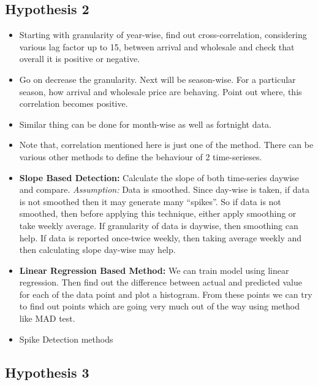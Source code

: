 \subsection{Hypothesis 2}

\begin{itemize}

\item Starting with granularity of year-wise, find out cross-correlation, considering various lag factor up to 15,  between arrival and wholesale and check that overall it is positive or negative.

\item Go on decrease the granularity. Next will be season-wise. For a particular season, how arrival and wholesale price are behaving. Point out where, this correlation becomes positive.

\item Similar thing can be done for month-wise as well as fortnight data. 

\item Note that, correlation mentioned here is just one of the method. There can be various other methods to define the behaviour of 2 time-serieses.

\item \textbf{Slope Based Detection:} Calculate the slope of both time-series daywise and compare. \textit{Assumption:} Data is smoothed. Since day-wise is taken, if data is not smoothed then it may generate many “spikes”. So if data is not smoothed, then before applying this technique, either apply smoothing or take weekly average. If granularity of data is daywise, then smoothing can help. If data is reported once-twice weekly, then taking average weekly and then calculating slope day-wise may help.

\item \textbf{Linear Regression Based Method:} We can train model using linear regression. Then find out the difference between actual and predicted value for each of the data point and plot a histogram. From these points we can try to find out points which are going very much out of the way using method like MAD test.

\item Spike Detection methods

\end{itemize}

\subsection{Hypothesis 3}

